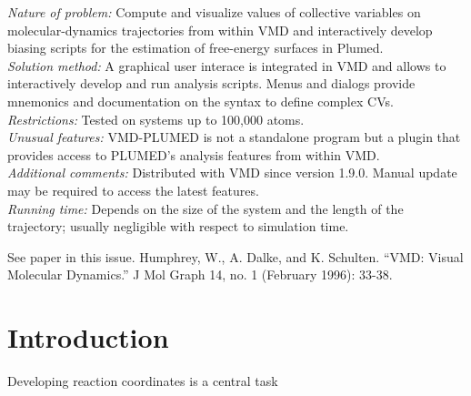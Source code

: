 \documentclass[preprint,12pt]{elsarticle}
\begin{document}
\begin{small}
  {\em Nature of problem:} Compute and visualize values of collective
  variables on molecular-dynamics trajectories from within VMD and
  interactively develop biasing scripts for the estimation of
  free-energy surfaces in Plumed.
  \\
  {\em Solution method:} A graphical user interace is integrated in
  VMD and allows to interactively develop and run analysis scripts.
  Menus and dialogs provide mnemonics and documentation on the syntax
  to define complex CVs.
  \\
  {\em Restrictions:}
  Tested on systems up to 100,000 atoms. \\
  {\em Unusual features:} VMD-PLUMED is not a standalone program but a
  plugin that provides access to PLUMED's analysis features from within VMD. \\
  {\em Additional comments:} Distributed with VMD since version 1.9.0.
  Manual  update may be required  to access the latest features.   \\
  {\em Running time:} Depends on the size of the system and the length
  of the trajectory; usually negligible with respect to simulation time.  \\
\begin{thebibliography}{0}
See paper in this issue.
Humphrey, W., A. Dalke, and K. Schulten. ``VMD: Visual Molecular Dynamics.'' J Mol Graph 14, no. 1 (February 1996): 33-38. 
\end{thebibliography}

\end{small}



\section{Introduction}

Developing reaction coordinates is a central task
\end{document}
